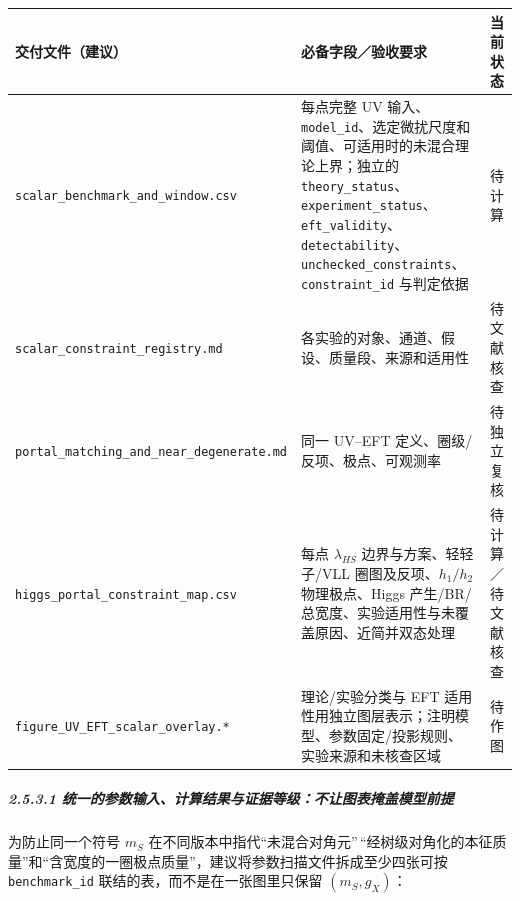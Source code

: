 \documentclass[
  chinese,
  UTF8]{ctexart}
\newcounter{none} %
\begin{document}
{\def\LTcaptype{none} %
\begin{longtable}[]{@{}
  >{\raggedright\arraybackslash}p{}
  >{\raggedright\arraybackslash}p{}
  >{\raggedright\arraybackslash}p{}@{}}
\toprule\noalign{}
\begin{minipage}[b]{\linewidth}\raggedright
交付文件（建议）
\end{minipage} & \begin{minipage}[b]{\linewidth}\raggedright
必备字段／验收要求
\end{minipage} & \begin{minipage}[b]{\linewidth}\raggedright
当前状态
\end{minipage} \\
\midrule\noalign{}
\endhead
\bottomrule\noalign{}
\endlastfoot
\texttt{scalar\_benchmark\_and\_window.csv} & 每点完整 UV
输入、\texttt{model\_id}、选定微扰尺度和阈值、可适用时的未混合理论上界；独立的
\texttt{theory\_status}、\texttt{experiment\_status}、\texttt{eft\_validity}、\texttt{detectability}、\texttt{unchecked\_constraints}、\texttt{constraint\_id}
与判定依据 & 待计算 \\
\texttt{scalar\_constraint\_registry.md} &
各实验的对象、通道、假设、质量段、来源和适用性 & 待文献核查 \\
\texttt{portal\_matching\_and\_near\_degenerate.md} & 同一 UV--EFT
定义、圈级/反项、极点、可观测率 & 待独立复核 \\
\texttt{higgs\_portal\_constraint\_map.csv} & 每点 \(\lambda_{HS}\)
边界与方案、轻轻子/VLL 圈图及反项、\(h_1/h_2\) 物理极点、Higgs
产生/BR/总宽度、实验适用性与未覆盖原因、近简并双态处理 &
待计算／待文献核查 \\
\texttt{figure\_UV\_EFT\_scalar\_overlay.*} & 理论/实验分类与 EFT
适用性用独立图层表示；注明模型、参数固定/投影规则、实验来源和未核查区域
& 待作图 \\
\end{longtable}
}

\subparagraph{2.5.3.1
统一的参数输入、计算结果与证据等级：不让图表掩盖模型前提}\label{ux7edfux4e00ux7684ux53c2ux6570ux8f93ux5165ux8ba1ux7b97ux7ed3ux679cux4e0eux8bc1ux636eux7b49ux7ea7ux4e0dux8ba9ux56feux8868ux63a9ux76d6ux6a21ux578bux524dux63d0}

为防止同一个符号 \(m_S\)
在不同版本中指代``未混合对角元''\,``经树级对角化的本征质量''和``含宽度的一圈极点质量''，建议将参数扫描文件拆成至少四张可按
\texttt{benchmark\_id} 联结的表，而不是在一张图里只保留 \((m_S,g_X)\)：
\end{document}
